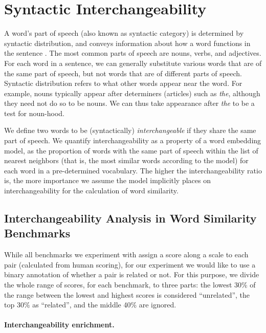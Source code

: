\documentclass[11pt,a4paper]{article}
\begin{document}
    
    \section{Syntactic Interchangeability}\label{sec:interchangeability}
    
    A word's part of speech (also known as syntactic category)
    is determined by syntactic distribution, and
    conveys information about how a word functions in the sentence \cite{carnie2002syntax}.
    The most common parts of speech are nouns, verbs, and adjectives.
    For each word in a sentence,
    we can generally substitute various words that are of the same part of speech,
    but not words that are of different parts of speech.
    Syntactic distribution refers to what other words appear
    near the word. For example, nouns typically appear after determiners (articles)
    such as \textit{the}, although they need not do so to be nouns. We can thus
    take appearance after \textit{the} to be a test for noun-hood.
    
    We define two words to be (syntactically) \textit{interchangeable}
    if they share the same part of speech.
    We quantify interchangeability
    as a property of a word embedding model,
    as the proportion of words with the same part of speech
    within the list of nearest neighbors
    (that is, the most similar words according to the model)
    for each word in a pre-determined vocabulary.
    The higher the interchangeability ratio is,
    the more importance we assume the model implicitly places on interchangeability
    for the calculation of word similarity.
    
    \subsection{Interchangeability Analysis in Word Similarity Benchmarks}\label{sec:benchmark_exp}
    
    While all benchmarks we experiment with assign a score along a scale to each pair
    (calculated from human scoring), for our experiment we would like to use
    a binary annotation of whether a pair is related or not.
    For this purpose, we divide the whole range of scores,
    for each benchmark, to three parts:
    the lowest 30\% of the range between the lowest and highest scores
    is considered ``unrelated'', the top 30\% as ``related'',
    and the middle 40\% are ignored.
    
    \paragraph{Interchangeability enrichment.}
    
\end{document}
